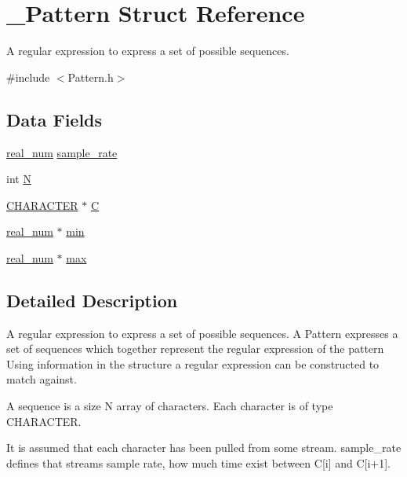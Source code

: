 \hypertarget{struct___pattern}{
\section{\_\-Pattern Struct Reference}
\label{struct___pattern}
}


A regular expression to express a set of possible sequences.  




{\ttfamily \#include $<$Pattern.h$>$}

\subsection*{Data Fields}
\begin{DoxyCompactItemize}
\item 
\hyperlink{_constants_8h_afc78ec715915283bee8ffa1ecc5c3f4d}{real\_\-num} \hyperlink{struct___pattern_a699592f96d08e00211f2e1ae82cfeb60}{sample\_\-rate}
\item 
int \hyperlink{struct___pattern_a7722c8ecbb62d99aee7ce68b1752f337}{N}
\item 
\hyperlink{_constants_8h_abcd6b269a1786cbab40e964ed99a8724}{CHARACTER} $\ast$ \hyperlink{struct___pattern_ace6a083ab9219ee974a505ec2e08e9cc}{C}
\item 
\hyperlink{_constants_8h_afc78ec715915283bee8ffa1ecc5c3f4d}{real\_\-num} $\ast$ \hyperlink{struct___pattern_a4f44fb0273d5bdbe12505fc74c4e53c5}{min}
\item 
\hyperlink{_constants_8h_afc78ec715915283bee8ffa1ecc5c3f4d}{real\_\-num} $\ast$ \hyperlink{struct___pattern_a205c3e88cd22e9df2e06e59aad19ef9e}{max}
\end{DoxyCompactItemize}


\subsection{Detailed Description}
A regular expression to express a set of possible sequences. A Pattern expresses a set of sequences which together represent the regular expression of the pattern Using information in the structure a regular expression can be constructed to match against.

A sequence is a size N array of characters. Each character is of type CHARACTER.

It is assumed that each character has been pulled from some stream. sample\_\-rate defines that streams sample rate, how much time exist between C\mbox{[}i\mbox{]} and C\mbox{[}i+1\mbox{]}.


